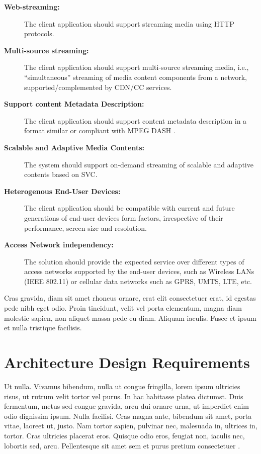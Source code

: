 \begin{description}
	\item[\textbf{Web-streaming:}]
	The client application should support streaming media using \ac{HTTP} protocols.
	\item[\textbf{Multi-source streaming:}]
	The client application should support multi-source streaming media, i.e., ``simultaneous'' streaming of media content components from a network, supported\slash complemented by \ac{CDN}\slash \ac{CC} services. 
	\item[\textbf{Support content Metadata Description:}]
	The client application should support content metadata description in a format similar or compliant with MPEG \ac{DASH} \cite{ISO/IEC:2012fk}. 
	\item[\textbf{Scalable and Adaptive Media Contents:}]
	The system should support on-demand streaming of scalable and adaptive contents based on \ac{SVC}.
	\item[\textbf{Heterogenous End-User Devices:}]
	The client application should be compatible with current and future generations of end-user devices form factors, irrespective of their performance, screen size and resolution.
	\item[\textbf{Access Network independency:}] 
	The solution should provide the expected service over different types of access networks supported by the end-user devices, such as Wireless \acp{LAN} (IEEE 802.11) or cellular data networks such as \ac{GPRS}, \ac{UMTS}, \ac{LTE}, etc.
\end{description}

Cras gravida, diam sit amet rhoncus ornare, erat elit consectetuer erat, id egestas pede nibh eget odio. Proin tincidunt, velit vel porta elementum, magna diam molestie sapien, non aliquet massa pede eu diam. Aliquam iaculis. Fusce et ipsum et nulla tristique facilisis.
\section{Architecture Design Requirements}
Ut nulla. Vivamus bibendum, nulla ut congue fringilla, lorem ipsum ultricies risus, ut rutrum velit tortor vel purus. In hac habitasse platea dictumst. Duis fermentum, metus sed congue gravida, arcu dui ornare urna, ut imperdiet enim odio dignissim ipsum. Nulla facilisi. Cras magna ante, bibendum sit amet, porta vitae, laoreet ut, justo. Nam tortor sapien, pulvinar nec, malesuada in, ultrices in, tortor. Cras ultricies placerat eros. Quisque odio eros, feugiat non, iaculis nec, lobortis sed, arcu. Pellentesque sit amet sem et purus pretium consectetuer .

